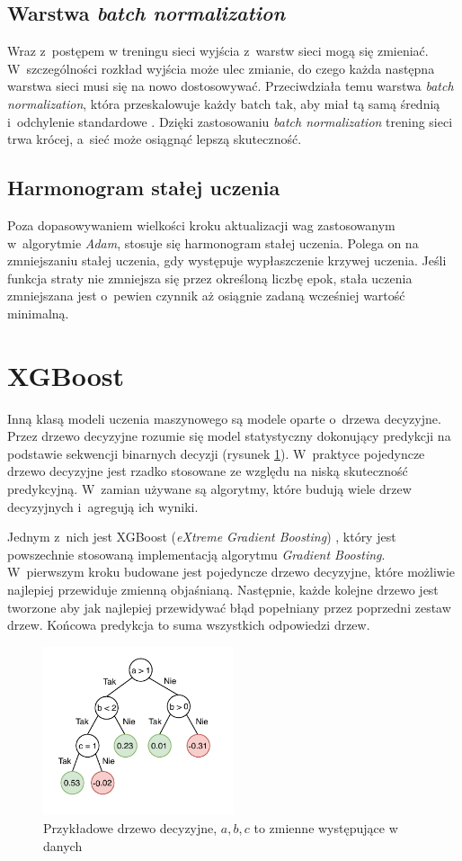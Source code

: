 \documentclass{pracalicmgr}
\begin{document}
	\subsection{Warstwa \textit{batch normalization}}
	Wraz z~postępem w treningu sieci wyjścia z~warstw sieci mogą się zmieniać. W~szczególności rozkład wyjścia może ulec zmianie, do czego każda następna warstwa sieci musi się na nowo dostosowywać. Przeciwdziała temu warstwa \textit{batch normalization}, która przeskalowuje każdy batch tak, aby miał tą samą średnią i~odchylenie standardowe \cite{batch_norm}. Dzięki zastosowaniu \textit{batch normalization} trening sieci trwa krócej, a~sieć może osiągnąć lepszą skuteczność.
	
	\subsection{Harmonogram stałej uczenia}
	Poza dopasowywaniem wielkości kroku aktualizacji wag zastosowanym w~algorytmie \textit{Adam}, stosuje się harmonogram stałej uczenia. Polega on na zmniejszaniu stałej uczenia, gdy występuje wypłaszczenie krzywej uczenia. Jeśli funkcja straty nie zmniejsza się przez określoną liczbę epok, stała uczenia zmniejszana jest o~pewien czynnik aż osiągnie zadaną wcześniej wartość minimalną.
	
	\section{XGBoost}
	Inną klasą modeli uczenia maszynowego są modele oparte o~drzewa decyzyjne. Przez drzewo decyzyjne rozumie się model statystyczny dokonujący predykcji na podstawie sekwencji binarnych decyzji (rysunek \ref{fig:tree}). W~praktyce pojedyncze drzewo decyzyjne jest rzadko stosowane ze względu na niską skuteczność predykcyjną. W~zamian używane są algorytmy, które budują wiele drzew decyzyjnych i~agregują ich wyniki.
	
	 Jednym z~nich jest XGBoost (\textit{eXtreme Gradient Boosting}) \cite{xgboost}, który jest powszechnie stosowaną implementacją algorytmu \textit{Gradient Boosting}. W~pierwszym kroku budowane jest pojedyncze drzewo decyzyjne, które możliwie najlepiej przewiduje zmienną objaśnianą. Następnie, każde kolejne drzewo jest tworzone aby jak najlepiej przewidywać błąd popełniany przez poprzedni zestaw drzew. Końcowa predykcja to suma wszystkich odpowiedzi drzew.
	
	\begin{figure}[h]
	\centering
	\includegraphics[width=0.5\textwidth]{tree.pdf}
	\caption{Przykładowe drzewo decyzyjne, $a, b, c$ to zmienne występujące w danych}
	\label{fig:tree}
	\end{figure}
	
\end{document}

